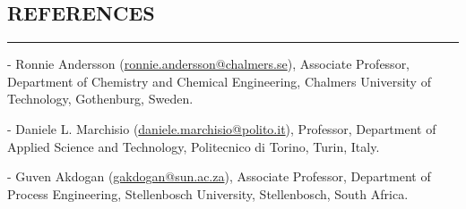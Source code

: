 \documentclass[10pt,a4]{article}
\begin{document}
\begin{small}







\end{small}

\subsection*{REFERENCES}
\hrule
\vspace{0.2cm}

\begin{list}{}{}
\item - Ronnie Andersson (\href{mailto:ronnie.andersson@chalmers.se}{ronnie.andersson@chalmers.se}), Associate Professor, Department of Chemistry and Chemical Engineering, Chalmers University of Technology, Gothenburg, Sweden.
\item - Daniele L. Marchisio (\href{mailto:daniele.marchisio@polito.it}{daniele.marchisio@polito.it}), Professor, Department of Applied Science and Technology, Politecnico di Torino, Turin, Italy.
\item - Guven Akdogan (\href{mailto:gakdogan@sun.ac.za}{gakdogan@sun.ac.za}), Associate Professor, Department of Process Engineering, Stellenbosch University, Stellenbosch, South Africa.
\end{list}

\thispagestyle{fancy}
\rfoot{\textcolor{gray}{Page \thepage}}
\fancyfoot[C]{}
\end{document}
